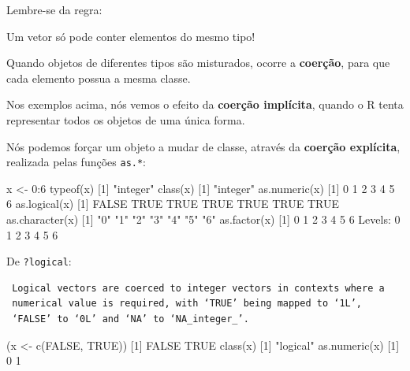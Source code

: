 \documentclass[
  10pt,
  a4paper]{book}
\newenvironment{Shaded}{\begin{snugshade}}{\end{snugshade}}
\newcommand{\ConstantTok}[1]{\textcolor[rgb]{0.00,0.00,0.00}{#1}}
\newcommand{\DecValTok}[1]{\textcolor[rgb]{0.00,0.00,0.81}{#1}}
\newcommand{\FunctionTok}[1]{\textcolor[rgb]{0.00,0.00,0.00}{#1}}
\newcommand{\NormalTok}[1]{#1}
\newcommand{\OtherTok}[1]{\textcolor[rgb]{0.56,0.35,0.01}{#1}}
\newcommand{\SpecialCharTok}[1]{\textcolor[rgb]{0.00,0.00,0.00}{#1}}
\newcommand{\StringTok}[1]{\textcolor[rgb]{0.31,0.60,0.02}{#1}}
\begin{document}
Lembre-se da regra:

Um vetor só pode conter elementos do mesmo tipo!

Quando objetos de diferentes tipos são misturados, ocorre a
\textbf{coerção}, para que cada elemento possua a mesma classe.

Nos exemplos acima, nós vemos o efeito da \textbf{coerção implícita}, quando
o R tenta representar todos os objetos de uma única forma.

Nós podemos forçar um objeto a mudar de classe, através da \textbf{coerção
explícita}, realizada pelas funções \texttt{as.*}:

\begin{Shaded}
\begin{Highlighting}[]
\NormalTok{x }\OtherTok{\textless{}{-}} \DecValTok{0}\SpecialCharTok{:}\DecValTok{6}
\FunctionTok{typeof}\NormalTok{(x)}
\NormalTok{[}\DecValTok{1}\NormalTok{] }\StringTok{"integer"}
\FunctionTok{class}\NormalTok{(x)}
\NormalTok{[}\DecValTok{1}\NormalTok{] }\StringTok{"integer"}
\FunctionTok{as.numeric}\NormalTok{(x)}
\NormalTok{[}\DecValTok{1}\NormalTok{] }\DecValTok{0} \DecValTok{1} \DecValTok{2} \DecValTok{3} \DecValTok{4} \DecValTok{5} \DecValTok{6}
\FunctionTok{as.logical}\NormalTok{(x)}
\NormalTok{[}\DecValTok{1}\NormalTok{] }\ConstantTok{FALSE}  \ConstantTok{TRUE}  \ConstantTok{TRUE}  \ConstantTok{TRUE}  \ConstantTok{TRUE}  \ConstantTok{TRUE}  \ConstantTok{TRUE}
\FunctionTok{as.character}\NormalTok{(x)}
\NormalTok{[}\DecValTok{1}\NormalTok{] }\StringTok{"0"} \StringTok{"1"} \StringTok{"2"} \StringTok{"3"} \StringTok{"4"} \StringTok{"5"} \StringTok{"6"}
\FunctionTok{as.factor}\NormalTok{(x)}
\NormalTok{[}\DecValTok{1}\NormalTok{] }\DecValTok{0} \DecValTok{1} \DecValTok{2} \DecValTok{3} \DecValTok{4} \DecValTok{5} \DecValTok{6}
\NormalTok{Levels}\SpecialCharTok{:} \DecValTok{0} \DecValTok{1} \DecValTok{2} \DecValTok{3} \DecValTok{4} \DecValTok{5} \DecValTok{6}
\end{Highlighting}
\end{Shaded}

De \texttt{?logical}:

\begin{verbatim}
 Logical vectors are coerced to integer vectors in contexts where a
 numerical value is required, with ‘TRUE’ being mapped to ‘1L’,
 ‘FALSE’ to ‘0L’ and ‘NA’ to ‘NA_integer_’.
\end{verbatim}

\begin{Shaded}
\begin{Highlighting}[]
\NormalTok{(x }\OtherTok{\textless{}{-}} \FunctionTok{c}\NormalTok{(}\ConstantTok{FALSE}\NormalTok{, }\ConstantTok{TRUE}\NormalTok{))}
\NormalTok{[}\DecValTok{1}\NormalTok{] }\ConstantTok{FALSE}  \ConstantTok{TRUE}
\FunctionTok{class}\NormalTok{(x)}
\NormalTok{[}\DecValTok{1}\NormalTok{] }\StringTok{"logical"}
\FunctionTok{as.numeric}\NormalTok{(x)}
\NormalTok{[}\DecValTok{1}\NormalTok{] }\DecValTok{0} \DecValTok{1}
\end{Highlighting}
\end{Shaded}
\end{document}
